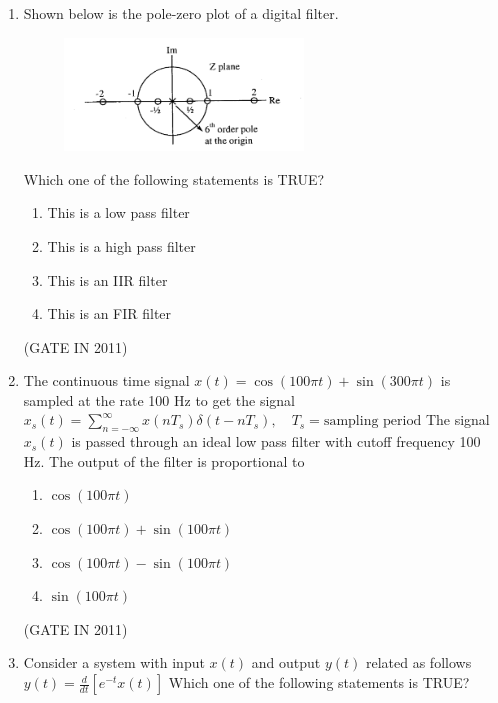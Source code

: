 \documentclass[journal]{IEEEtran}
\begin{document}
\begin{enumerate}
\item Shown below is the pole-zero plot of a digital filter.
\begin{figure}[H]
    \centering
      \includegraphics[width=0.6\textwidth]{2.png} 
      \caption{}
    \label{fig:fig2} 
\end{figure}
Which one of the following statements is TRUE?
\begin{multicols}{2}
\begin{enumerate}
\item This is a low pass filter
\item This is a high pass filter
\item This is an IIR filter
\item This is an FIR filter
\end{enumerate}
\end{multicols} \hfill(GATE IN 2011)

\item The continuous time signal $x(t) = \cos(100\pi t) + \sin(300\pi t)$ is sampled at the rate 100 Hz to get the signal
$x_s(t) = \sum_{n=-\infty}^{\infty} x(nT_s) \delta(t-nT_s), \quad T_s = \text{sampling period}$
The signal $x_s(t)$ is passed through an ideal low pass filter with cutoff frequency 100 Hz. The output of the filter is proportional to

\begin{multicols}{2}
\begin{enumerate}
\item $\cos(100\pi t)$
\item $\cos(100\pi t) + \sin(100\pi t)$
\item $\cos(100\pi t) - \sin(100\pi t)$
\item $\sin(100\pi t)$
\end{enumerate}
\end{multicols} \hfill(GATE IN 2011)

\item Consider a system with input $x(t)$ and output $y(t)$ related as follows
$y(t) = \frac{d}{dt} \left[ e^{-t} x(t) \right]$
Which one of the following statements is TRUE?


\end{enumerate}
\end{document}
